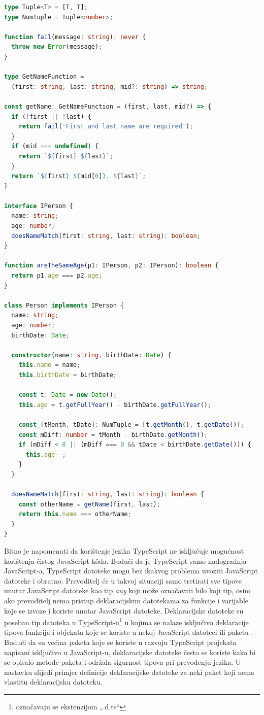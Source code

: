 \documentclass[times, utf8, diplomski, numeric]{fer}
\newcommand{\razmakp}{\vspace{18pt}}
\newcommand{\razmaks}{\vspace{10pt}}
\begin{document}
\razmakp %
\begin{lstlisting}[language=TypeScript, caption={Primjer definiranja i korištenja TypeScript tipova}, label={lst:typescript}]
type Tuple<T> = [T, T];
type NumTuple = Tuple<number>;

function fail(message: string): never {
  throw new Error(message);
}

type GetNameFunction =
  (first: string, last: string, mid?: string) => string;

const getName: GetNameFunction = (first, last, mid?) => {
  if (!first || !last) {
    return fail('First and last name are required');
  }
  if (mid === undefined) {
    return `${first} ${last}`;
  }
  return `${first} ${mid[0]}. ${last}`;
}

interface IPerson {
  name: string;
  age: number;
  doesNameMatch(first: string, last: string): boolean;
}

function areTheSameAge(p1: IPerson, p2: IPerson): boolean {
  return p1.age === p2.age;
}

class Person implements IPerson {
  name: string;
  age: number;
  birthDate: Date;

  constructor(name: string, birthDate: Date) {
    this.name = name;
    this.birthDate = birthDate;
  
    const t: Date = new Date();
    this.age = t.getFullYear() - birthDate.getFullYear();

    const [tMonth, tDate]: NumTuple = [t.getMonth(), t.getDate()];
    const mDiff: number = tMonth - birthDate.getMonth();
    if (mDiff < 0 || (mDiff === 0 && tDate < birthDate.getDate())) {
      this.age--;
    }
  }

  doesNameMatch(first: string, last: string): boolean {
    const otherName = getName(first, last);
    return this.name === otherName;
  }
}

\end{lstlisting}
\razmaks

Bitno je napomenuti da korištenje jezika TypeScript ne isključuje mogućnost korištenja čistog JavaScript kôda.
Budući da je TypeScript samo nadogradnja JavaScript-a, TypeScript datoteke mogu bez ikakvog problema uvoziti  JavaScript datoteke i obratno.
Prevoditelj će u takvoj situaciji samo tretirati sve tipove unutar JavaScript datoteke kao tip \emph{any} koji može označavati bilo koji tip, osim ako prevoditelj nema pristup deklaracijskim datotekama  za funkcije i varijable koje se izvoze  i koriste unutar JavaScript datoteke.
Deklaracijske datoteke su poseban tip datoteka u TypeScript-u\footnote{označavaju se ekstenzijom „.d.ts“} u kojima se nalaze isključivo deklaracije tipova funkcija i objekata koje se koriste u nekoj JavaScript datoteci ili paketu \citep{ts_hand}.
Budući da su većina paketa koje se koriste u razvoju TypeScript projekata napisani isključivo u JavaScript-u, deklaracijske datoteke često se koriste kako bi se opisalo metode paketa i održala sigurnost tipova pri prevođenju jezika.
U nastavku slijedi primjer definicije deklaracijske datoteke za neki paket koji nema vlastitu deklaracijsku datoteku.
\end{document}
